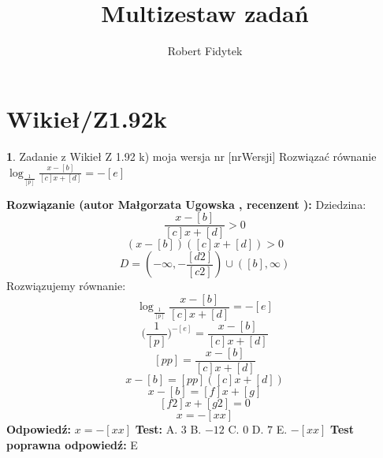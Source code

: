 \documentclass[12pt, a4paper]{article}
\title{Multizestaw zadań}
\author{Robert Fidytek}
\date{}
\theoremstyle{definition} %
\newtheorem{zad}{}
\newcommand{\kategoria}[1]{\section{#1}} %
\newcommand{\zadStart}[1]{\begin{zad}#1\newline} %
\newcommand{\zadStop}{\end{zad}}   %
\newcommand{\rozwStart}[2]{\noindent \textbf{Rozwiązanie (autor #1 , recenzent #2): }\newline} %
\newcommand{\rozwStop}{\newline}                                            %
\newcommand{\odpStart}{\noindent \textbf{Odpowiedź:}\newline}    %
\newcommand{\odpStop}{\newline}                                             %
\newcommand{\testStart}{\noindent \textbf{Test:}\newline} %
\newcommand{\testStop}{\newline} %
\newcommand{\kluczStart}{\noindent \textbf{Test poprawna odpowiedź:}\newline} %
\newcommand{\kluczStop}{\newline} %
\begin{document}
\maketitle


\kategoria{Wikieł/Z1.92k}
\zadStart{Zadanie z Wikieł Z 1.92 k) moja wersja nr [nrWersji]}
Rozwiązać równanie $\log_{\frac{1}{[p]}}{\frac{x-[b]}{[c]x+[d]}}=-[e]$
\zadStop
\rozwStart{Małgorzata Ugowska}{}
Dziedzina:
$$\frac{x-[b]}{[c]x+[d]}>0$$
$$(x-[b])([c]x+[d])>0$$
$$D=(-\infty, -\frac{[d2]}{[c2]}) \cup ([b], \infty)$$
Rozwiązujemy równanie:
$$\log_{\frac{1}{[p]}}{\frac{x-[b]}{[c]x+[d]}}=-[e]$$
$$\Big({\frac{1}{[p]}}\Big)^{-[e]}= \frac{x-[b]}{[c]x+[d]}$$
$$[pp] = \frac{x-[b]}{[c]x+[d]}$$
$$x -[b]= [pp]([c]x+[d])$$
$$x -[b]= [f]x+[g]$$
$$[f2]x+[g2]=0$$
$$x=-[xx]$$
\rozwStop
\odpStart
$x =-[xx]$
\odpStop
\testStart
A. $3$
B. $-12$
C. $0$
D. $7$
E. $-[xx]$
\testStop
\kluczStart
E
\kluczStop
\end{document}
